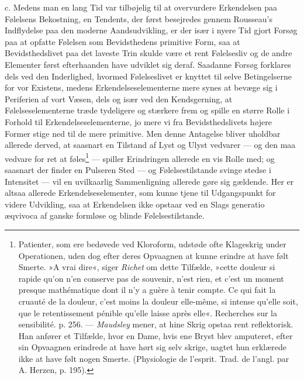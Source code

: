 \documentclass[12pt,a4paper,openany]{book}
\newcommand{\opage}[1]{\marginnote{\footnotesize\textit{[#1]}}}
\begin{document}
c. Medens man en lang Tid var tilbøjelig til at overvurdere Erkendelsen
paa Følelsens Bekostning, en Tendents, der først besejredes gennem
Rousseau’s Indflydelse paa den moderne Aandsudvikling, er der især i
nyere Tid gjort Forsøg paa at opfatte Følelsen som Bevidsthedens
primitive Form, saa at Bevidsthedslivet paa det laveste Trin skulde være
et rent Følelsesliv og de andre Elementer først efterhaanden have
udviklet sig deraf. Saadanne Forsøg forklares dels ved den Inderlighed,
hvormed Følelseslivet er knyttet til selve Betingelserne for vor
Existens, medens Erkendelseselementerne mere synes at bevæge sig i
Periferien af vort Væsen, dels og især ved den Kendsgerning, at
Følelseselementerne træde tydeligere og stærkere frem og spille en
større Rolle i Forhold til Erkendelseselementerne, jo mere vi fra
Bevidsthedslivets højere Former stige ned til de mere primitive. Men
denne Antagelse
\opage{114}bliver uholdbar allerede derved, at saasnart en Tilstand af
Lyst og Ulyst vedvarer --- og den maa vedvare for ret at
føles\footnote[1]{Patienter, som ere bedøvede ved Kloroform, udstøde
ofte Klageskrig under Operationen, uden dog efter deres Opvaagnen at
kunne erindre at have følt Smerte. »A vrai dire«, siger \emph{Richet} om
dette Tilfælde, »cette douleur si rapide qu’on n’en conserve pas de
souvenir, n’est rien, et c’est un moment presque mathématique dont il
n’y a guère à tenir compte. Ce qui fait la cruauté de la douleur, c’est
moins la douleur elle-même, si intense qu’elle soit, que le
retentissement pénible qu’elle laisse après elle«. Recherches sur la
sensibilité. p. 256. --- \emph{Maudsley} mener, at hine Skrig opstaa
rent reflektorisk. Han anfører et Tilfælde, hvor en Dame, hvis ene Bryst
blev amputeret, efter sin Opvaagnen erindrede at have hørt sig selv
skrige, uagtet hun erklærede ikke at have følt nogen Smerte.
(Physiologie de l’esprit. Trad. de l’angl. par A. Herzen, p. 195).} ---
spiller Erindringen allerede en vis Rolle med; og saasnart der finder en
Pulseren Sted --- og Følelsestilstande svinge stedse i Intensitet ---
vil en uvilkaarlig Sammenligning allerede gøre sig gældende. Her er
altsaa allerede Erkendelseselementer, som kunne tjene til Udgangspunkt
for videre Udvikling, saa at Erkendelsen ikke opstaar ved en Slags
generatio æqvivoca af ganske formløse og blinde Følelsestilstande.
\end{document}
